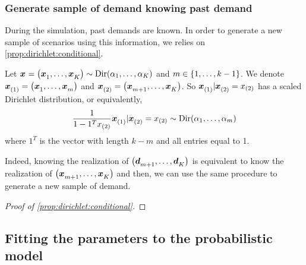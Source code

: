 \subsubsection{Generate sample of demand knowing past demand}


During the simulation, past demands are known.
In order to generate a new sample of scenarios using this information, we relies on \cref{prop:dirichlet:conditional}.


\begin{prop}\label{prop:dirichlet:conditional}
  Let $\va x=\bracket{\va x_1,\ldots,\va x_K}\sim \Dir\bracket{\alpha_1,\ldots,\alpha_K}$ and $m\in\range[1]{k-1}$.
  We denote $\va x_{(1)}=\bracket{\va x_1,\ldots,\va x_m}$ and $\va x_{(2)}=\bracket{\va x_{m+1},\ldots,\va x_K}$.
  So $\va x_{(1)}|\va x_{(2)}=x_{(2)}$ has a scaled Dirichlet distribution, or equivalently,
  $$
  \frac{1}{1-1^T x_{(2)}} \va x_{(1)}|\va x_{(2)}=x_{(2)}
  \sim
  \Dir\bracket{\alpha_1,\ldots,\alpha_m}
  $$
  where $1^T$ is the vector with length $k-m$ and all entries equal to 1.
\end{prop}

Indeed, knowing the realization of $\bracket{\va\demand_{m+1},\ldots,\va\demand_K}$ is equivalent to know the realization of $\bracket{\va x_{m+1},\ldots,\va x_K}$ and then, we can use the same procedure to generate a new sample of demand.

\begin{proof}[Proof of \cref{prop:dirichlet:conditional}]
\end{proof}




\subsection{Fitting the parameters to the probabilistic model}





